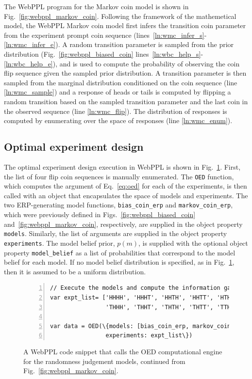 \documentclass{article}
\begin{document}
The WebPPL program for the Markov coin model is shown in Fig.~\ref{fig:webppl_markov_coin}.  Following the framework of the mathemetical model, the WebPPL Markov coin model first infers the transition coin parameter from the experiment prompt coin sequence (lines~\ref{ln:wmc_infer_s}-\ref{ln:wmc_infer_e}). A random transition parameter is sampled from the prior distribution (Fig.~\ref{fig:webppl_biased_coin} lines~\ref{ln:wbc_help_s}-\ref{ln:wbc_help_e}), and is used to compute the probability of observing the coin flip sequence given the sampled prior distribution. A transition parameter is then sampled from the marginal distribution conditioned on the coin sequence (line \ref{ln:wmc_sample}) and a response of heads or tails is computed by flipping a random transition based on the sampled transition parameter and the last coin in the observed sequence (line \ref{ln:wmc_flip}). The distribution of responses is computed by enumerating over the space of responses (line \ref{ln:wmc_enum}). 

\subsection{Optimal experiment design}

The optimal experiment design execution in WebPPL is shown in Fig.~\ref{fig:webppl_oed}. First, the list of four flip coin sequences is manually enumerated. The \texttt{OED} function, which computes the argument of Eq.~\ref{eq:oed} for each of the experiments, is then called with an object that encapsulates the space of models and experiments. The two ERP-generating model functions, \texttt{bias\_coin\_erp} and \texttt{markov\_coin\_erp}, which were previously defined in Figs.~\ref{fig:webppl_biased_coin} and~\ref{fig:webppl_markov_coin}, respectively, are supplied in the object property \texttt{models}. Similarly, the list of arguments are supplied in the object property \texttt{experiments}. The model belief prior, $p(m)$, is supplied with the optional object property \texttt{model\_belief} as a list of probabilities that correspond to the model belief for each model. If no model belief distribution is specified, as in Fig.~\ref{fig:webppl_oed}, then it is assumed to be a uniform distribution. 

\begin{figure}[h]
\begin{Verbatim}[numbers=left,numbersep=1pt,frame=single,commandchars=\\\{\},fontfamily=courier,fontsize=\scriptsize,firstnumber=last]
// Execute the models and compute the information gain
var expt_list= ['HHHH', 'HHHT', 'HHTH', 'HHTT', 'HTHH', 'HTHT', 'HTTH', 'HTTT', 
                'THHH', 'THHT', 'THTH', 'THTT', 'TTHH', 'TTHT', 'TTTH', 'TTTT'];

var data = OED(\{models: [bias_coin_erp, markov_coin_erp], 
                experiments: expt_list\})
\end{Verbatim}
\centering
\caption{A WebPPL code snippet that calls the OED computational engine for the randomness judgement models, continued from Fig.~\ref{fig:webppl_markov_coin}.}
\label{fig:webppl_oed}
\end{figure}
\end{document}
